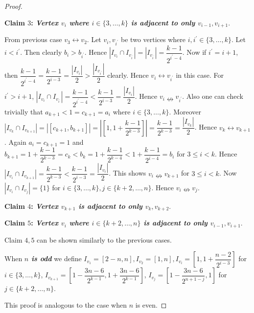 \documentclass{article}
\theoremstyle{definition}
\numberwithin{equation}{section}
\begin{document}
\begin{proof}
\begin{itemize}
\vspace{1em}
\noindent \textbf{Claim $3$:\textit{ Vertex $v_{i}$ where $i\in\{3,\hdots,k\}$ is adjacent to only $v_{i-1},v_{i+1}$}}.

\vspace{.1em} \noindent From previous case $v_{3}\leftrightarrow v_{2}$. Let $v_{i},v_{i^{'}}$ be two vertices where $i,i^{'}\in\{3,\hdots,k\}$. Let $i<i^{'}$. Then clearly $b_{i}>b_{i^{'}}$. Hence $|I_{v_{i}}\cap I_{v_{i^{'}}}|=|I_{v_{i^{'}}}|=\dfrac{k-1}{2^{i^{'}-4}}$. Now if $i^{'}=i+1$, then $\dfrac{k-1}{2^{i^{'}-4}}=\dfrac{k-1}{2^{i-3}}=\dfrac{|I_{v_{i}}|}{2}>\dfrac{|I_{v_{i^{'}}}|}{2}$ clearly. Hence $v_{i}\leftrightarrow v_{i^{'}}$ in this case. For $i^{'}>i+1$, $|I_{v_{i}}\cap I_{v_{i^{'}}}|=\dfrac{k-1}{2^{i^{'}-4}}<\dfrac{k-1}{2^{i-3}}=\dfrac{|I_{v_{i}}|}{2}$. Hence $v_{i}\nleftrightarrow v_{i^{'}}$. Also one can check trivially that $a_{k+1}<1=c_{k+1}=a_{i}$ where $i\in\{3,\hdots,k\}$. Moreover $|I_{v_{k}}\cap I_{v_{k+1}}|=|[c_{k+1},b_{k+1}]|=|[1,1+\dfrac{k-1}{2^{k-3}}]|=\dfrac{k-1}{2^{k-3}}=\dfrac{|I_{v_{k}}|}{2}$. Hence $v_{k}\leftrightarrow v_{k+1}$. Again $a_{i}=c_{k+1}=1$ and $b_{k+1}=1+\dfrac{k-1}{2^{k-3}}=c_{k}<b_{k}=1+\dfrac{k-1}{2^{k-4}}<1+\dfrac{k-1}{2^{i-4}}=b_{i}$ for $3\leq i<k$. Hence $|I_{v_{i}}\cap I_{v_{k+1}}|=\dfrac{k-1}{2^{k-3}}<\dfrac{k-1}{2^{i-3}}=\dfrac{|I_{v_{i}}|}{2}$. This shows $v_{i}\nleftrightarrow v_{k+1}$ for $3\leq i<k$. Now $|I_{v_{i}}\cap I_{v_{j}}|=\{1\}$ for $i\in\{3,\hdots,k\},j\in\{k+2,\hdots,n\}$. Hence $v_{i}\nleftrightarrow v_{j}$.

\vspace{1em}
\noindent \textbf{Claim $4$:\textit{ Vertex $v_{k+1}$ is adjacent to only $v_{k},v_{k+2}$}}.

\vspace{1em}
\noindent \textbf{Claim $5$:\textit{ Vertex $v_{i}$ where $i\in\{k+2,\hdots,n\}$ is adjacent to only $v_{i-1},v_{i+1}$}}.


\vspace{.4em}\noindent
Claim $4,5$ can be shown similarly to the previous cases.

\noindent When \textbf{\emph{$n$ is odd}} we define $I_{v_{1}}=[2-n,n],I_{v_{2}}=[1,n], I_{v_{i}}=[1,1+\dfrac{n-2}{2^{i-3}}]$ for $i\in\{3,\hdots,k\}$, $I_{v_{k+1}}=[1-\dfrac{3n-6}{2^{k-1}},1+\dfrac{3n-6}{2^{k-1}}]$,
$I_{v_{j}}=[1-\dfrac{3n-6}{2^{n+1-j}},1]$ for $j\in\{k+2,\hdots,n\}$. 
\end{itemize}
\hspace{1.8 em} \noindent This proof is analogous to the case when $n$ is even. 
\end{proof}
\end{document}
